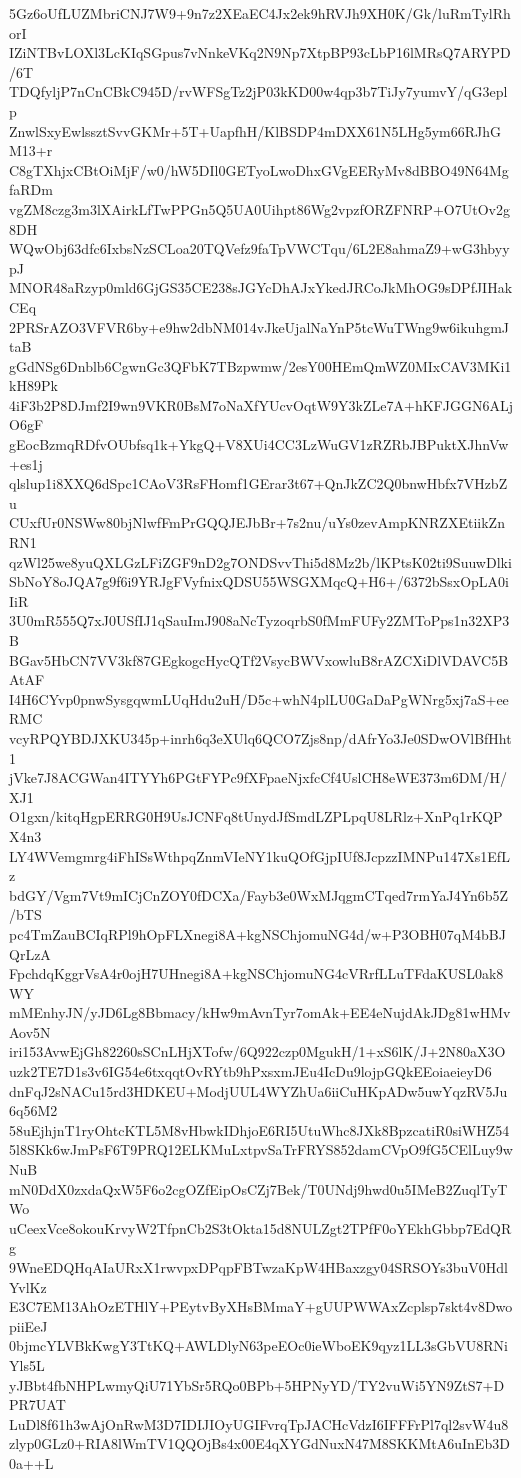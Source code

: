 5Gz6oUfLUZMbriCNJ7W9+9n7z2XEaEC4Jx2ek9hRVJh9XH0K/Gk/luRmTylRhorI
IZiNTBvLOXl3LcKIqSGpus7vNnkeVKq2N9Np7XtpBP93cLbP16lMRsQ7ARYPD/6T
TDQfyljP7nCnCBkC945D/rvWFSgTz2jP03kKD00w4qp3b7TiJy7yumvY/qG3eplp
ZnwlSxyEwlssztSvvGKMr+5T+UapfhH/KlBSDP4mDXX61N5LHg5ym66RJhGM13+r
C8gTXhjxCBtOiMjF/w0/hW5DIl0GETyoLwoDhxGVgEERyMv8dBBO49N64MgfaRDm
vgZM8czg3m3lXAirkLfTwPPGn5Q5UA0Uihpt86Wg2vpzfORZFNRP+O7UtOv2g8DH
WQwObj63dfc6IxbsNzSCLoa20TQVefz9faTpVWCTqu/6L2E8ahmaZ9+wG3hbyypJ
MNOR48aRzyp0mld6GjGS35CE238sJGYcDhAJxYkedJRCoJkMhOG9sDPfJIHakCEq
2PRSrAZO3VFVR6by+e9hw2dbNM014vJkeUjalNaYnP5tcWuTWng9w6ikuhgmJtaB
gGdNSg6Dnblb6CgwnGc3QFbK7TBzpwmw/2esY00HEmQmWZ0MIxCAV3MKi1kH89Pk
4iF3b2P8DJmf2I9wn9VKR0BsM7oNaXfYUcvOqtW9Y3kZLe7A+hKFJGGN6ALjO6gF
gEocBzmqRDfvOUbfsq1k+YkgQ+V8XUi4CC3LzWuGV1zRZRbJBPuktXJhnVw+es1j
qlslup1i8XXQ6dSpc1CAoV3RsFHomf1GErar3t67+QnJkZC2Q0bnwHbfx7VHzbZu
CUxfUr0NSWw80bjNlwfFmPrGQQJEJbBr+7s2nu/uYs0zevAmpKNRZXEtiikZnRN1
qzWl25we8yuQXLGzLFiZGF9nD2g7ONDSvvThi5d8Mz2b/lKPtsK02ti9SuuwDlki
SbNoY8oJQA7g9f6i9YRJgFVyfnixQDSU55WSGXMqcQ+H6+/6372bSsxOpLA0iIiR
3U0mR555Q7xJ0USfIJ1qSauImJ908aNcTyzoqrbS0fMmFUFy2ZMToPps1n32XP3B
BGav5HbCN7VV3kf87GEgkogcHycQTf2VsycBWVxowluB8rAZCXiDlVDAVC5BAtAF
I4H6CYvp0pnwSysgqwmLUqHdu2uH/D5c+whN4plLU0GaDaPgWNrg5xj7aS+eeRMC
vcyRPQYBDJXKU345p+inrh6q3eXUlq6QCO7Zjs8np/dAfrYo3Je0SDwOVlBfHht1
jVke7J8ACGWan4ITYYh6PGtFYPc9fXFpaeNjxfcCf4UslCH8eWE373m6DM/H/XJ1
O1gxn/kitqHgpERRG0H9UsJCNFq8tUnydJfSmdLZPLpqU8LRlz+XnPq1rKQPX4n3
LY4WVemgmrg4iFhISsWthpqZnmVIeNY1kuQOfGjpIUf8JcpzzIMNPu147Xs1EfLz
bdGY/Vgm7Vt9mICjCnZOY0fDCXa/Fayb3e0WxMJqgmCTqed7rmYaJ4Yn6b5Z/bTS
pc4TmZauBCIqRPl9hOpFLXnegi8A+kgNSChjomuNG4d/w+P3OBH07qM4bBJQrLzA
FpchdqKggrVsA4r0ojH7UHnegi8A+kgNSChjomuNG4cVRrfLLuTFdaKUSL0ak8WY
mMEnhyJN/yJD6Lg8Bbmacy/kHw9mAvnTyr7omAk+EE4eNujdAkJDg81wHMvAov5N
iri153AvwEjGh82260sSCnLHjXTofw/6Q922czp0MgukH/1+xS6lK/J+2N80aX3O
uzk2TE7D1s3v6IG54e6txqqtOvRYtb9hPxsxmJEu4IcDu9lojpGQkEEoiaeieyD6
dnFqJ2sNACu15rd3HDKEU+ModjUUL4WYZhUa6iiCuHKpADw5uwYqzRV5Ju6q56M2
58uEjhjnT1ryOhtcKTL5M8vHbwkIDhjoE6RI5UtuWhc8JXk8BpzcatiR0siWHZ54
5l8SKk6wJmPsF6T9PRQ12ELKMuLxtpvSaTrFRYS852damCVpO9fG5CElLuy9wNuB
mN0DdX0zxdaQxW5F6o2cgOZfEipOsCZj7Bek/T0UNdj9hwd0u5IMeB2ZuqlTyTWo
uCeexVce8okouKrvyW2TfpnCb2S3tOkta15d8NULZgt2TPfF0oYEkhGbbp7EdQRg
9WneEDQHqAIaURxX1rwvpxDPqpFBTwzaKpW4HBaxzgy04SRSOYs3buV0HdlYvlKz
E3C7EM13AhOzETHlY+PEytvByXHsBMmaY+gUUPWWAxZcplsp7skt4v8DwopiiEeJ
0bjmcYLVBkKwgY3TtKQ+AWLDlyN63peEOc0ieWboEK9qyz1LL3sGbVU8RNiYls5L
yJBbt4fbNHPLwmyQiU71YbSr5RQo0BPb+5HPNyYD/TY2vuWi5YN9ZtS7+DPR7UAT
LuDl8f61h3wAjOnRwM3D7IDIJIOyUGIFvrqTpJACHcVdzI6IFFFrPl7ql2svW4u8
zlyp0GLz0+RIA8lWmTV1QQOjBs4x00E4qXYGdNuxN47M8SKKMtA6uInEb3D0a++L
